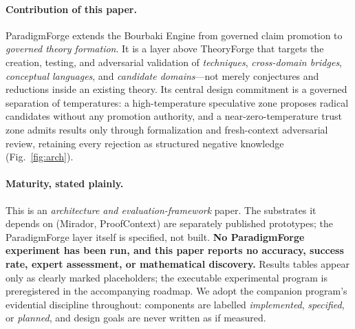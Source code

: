 \documentclass[11pt]{article}
\theoremstyle{definition}
\theoremstyle{remark}
\newcommand{\PF}{ParadigmForge}
\begin{document}
\paragraph{Contribution of this paper.}
\PF{} extends the Bourbaki Engine from governed claim promotion to \emph{governed theory
formation}. It is a layer above TheoryForge that targets the creation, testing, and adversarial
validation of \emph{techniques}, \emph{cross-domain bridges}, \emph{conceptual languages}, and
\emph{candidate domains}---not merely conjectures and reductions inside an existing theory. Its
central design commitment is a governed separation of temperatures: a high-temperature speculative
zone proposes radical candidates without any promotion authority, and a near-zero-temperature trust
zone admits results only through formalization and fresh-context adversarial review, retaining
every rejection as structured negative knowledge (Fig.~\ref{fig:arch}).

\paragraph{Maturity, stated plainly.}
This is an \emph{architecture and evaluation-framework} paper. The substrates it depends on
(Mirador, ProofContext) are separately published prototypes; the \PF{} layer itself is specified,
not built. \textbf{No \PF{} experiment has been run, and this paper reports no accuracy, success
rate, expert assessment, or mathematical discovery.} Results tables appear only as clearly marked
placeholders; the executable experimental program is preregistered in the accompanying roadmap. We
adopt the companion program's evidential discipline throughout: components are labelled
\emph{implemented}, \emph{specified}, or \emph{planned}, and design goals are never written as if
measured.
\end{document}
